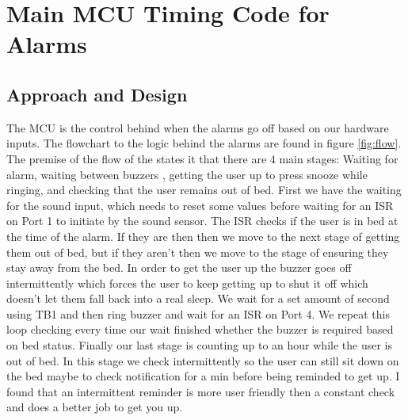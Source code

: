 \documentclass[11pt]{article}
\begin{document}
\section{Main MCU Timing Code for Alarms}
\subsection*{Approach and Design}
The MCU is the control behind when the alarms go off based on our hardware inputs. 
The flowchart to the logic behind the alarms are found in figure \ref{fig:flow}.
The premise of the flow of the states it that there are 4 main stages: Waiting for alarm, waiting between buzzers , getting the user up to press snooze while ringing, and checking that the user remains out of bed.   
First we have the waiting for the sound input, which needs to reset some values before waiting for an ISR on Port 1 to initiate by the sound sensor.
The ISR checks if the user is in bed at the time of the alarm.
If they are then then we move to the next stage of getting them out of bed, but if they aren't then we move to the stage of ensuring they stay away from the bed.
In order to get the user up the buzzer goes off intermittently which forces the user to keep getting up to shut it off which doesn't let them fall back into a real sleep.
We wait for a set amount of second using TB1 and then ring buzzer and wait for an ISR on Port 4.
We repeat this loop checking every time our wait finished whether the buzzer is required based on bed status. 
Finally our last stage is counting up to an hour while the user is out of bed. 
In this stage we check intermittently so the user can still sit down on the bed maybe to check notification for a min before being reminded to get up.  
I found that an intermittent reminder is more user friendly then a constant check and does a better job to get you up. \\
\end{document}
